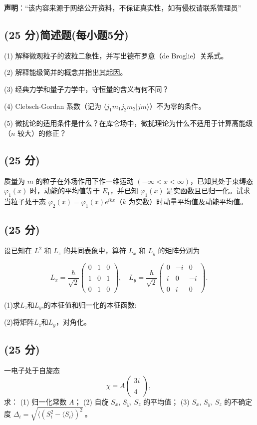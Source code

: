 
\textbf{声明}：“该内容来源于网络公开资料，不保证真实性，如有侵权请联系管理员”

\subsection{(25 分)简述题(每小题5分)}
(1) 解释微观粒子的波粒二象性，并写出德布罗意（de Broglie）关系式。

(2) 解释能级简并的概念并指出其起因。

(3) 经典力学和量子力学中，守恒量的含义有何不同？

(4) Clebsch-Gordan 系数（记为 $\langle  j_1 m_1 j_2 m_2|j m  \rangle$）不为零的条件。

(5) 微扰论的适用条件是什么？在库仑场中，微扰理论为什么不适用于计算高能级（$n$ 较大）的修正？

\subsection{(25 分)}
质量为 \( m \) 的粒子在外场作用下作一维运动 \((- \infty < x < \infty)\)，已知其处于束缚态 \(\varphi_1(x)\) 时，动能的平均值等于 \( E_1 \)，并已知 \(\varphi_1(x)\) 是实函数且已归一化。试求当粒子处于态 \(\varphi_2(x) = \varphi_1(x) e^{ikx}\)（\(k\) 为实数）时动量平均值及动能平均值。
\subsection{(25 分)}
设已知在 \( L^2 \) 和 \( L_z \) 的共同表象中，算符 \( L_x \) 和 \( L_y \) 的矩阵分别为

$$L_x = \frac{\hbar}{\sqrt{2}}\begin{pmatrix}0 & 1 & 0 \\\\1 & 0 & 1 \\\\0 & 1 & 0\end{pmatrix}, \quad L_y = \frac{\hbar}{\sqrt{2}}\begin{pmatrix}0 & -i & 0 \\\\i & 0 & -i \\\\0 & i & 0\end{pmatrix}.~$$

(1)求\( L_z \)和\( L_y \),的本征值和归一化的本征函数:

(2)将矩阵\( L_z \)和\( L_y \)，对角化。
\subsection{(25 分)}
一电子处于自旋态
\[\chi = A\begin{pmatrix}3i \\\\4\end{pmatrix},~\]
求：
(1) 归一化常数 \( A \)；
(2) 自旋 \( S_x \), \( S_y \), \( S_z \) 的平均值；
(3) \( S_x \), \( S_y \), \( S_z \) 的不确定度 \(\Delta_i = \sqrt{\langle (S_i^2  - \langle S_i \rangle)^2}~\)。

